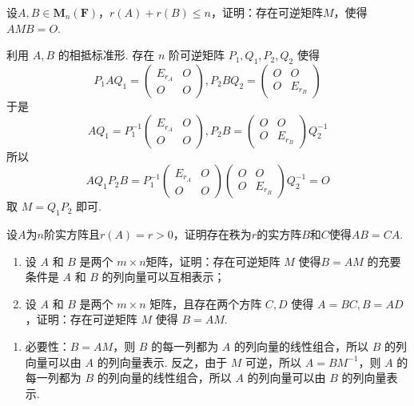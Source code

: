 \begin{exercise}
\begin{exgroup}
        \item 设$A,B \in \mathbf{M}_n(\mathbf{F})$，$r(A)+r(B) \leqslant n$，证明：存在可逆矩阵$M$，使得$AMB=O$.
        \begin{answer}
            利用 $A,B$ 的相抵标准形. 存在 $n$ 阶可逆矩阵 $P_1,Q_1,P_2,Q_2$ 使得
          \[P_1AQ_1=\begin{pmatrix}E_{r_A} & O \\ O & O\end{pmatrix},P_2BQ_2=\begin{pmatrix}O & O \\ O & E_{r_B}\end{pmatrix}\]
          于是 \[AQ_1=P_1^{-1}\begin{pmatrix}E_{r_A} & O \\ O & O\end{pmatrix},P_2B=\begin{pmatrix}O & O \\ O & E_{r_B}\end{pmatrix}Q_2^{-1}\]
          所以 \[AQ_1P_2B=P_1^{-1}\begin{pmatrix}E_{r_A} & O \\ O & O\end{pmatrix}\begin{pmatrix}O & O \\ O & E_{r_B}\end{pmatrix}Q_2^{-1}=O\]
          取 $M=Q_1P_2$ 即可.
        \end{answer}

        \item 设$A$为$n$阶实方阵且$r(A)=r>0$，证明存在秩为$r$的实方阵$B$和$C$使得$AB=CA$.
        \begin{answer}

        \end{answer}

        \item \begin{enumerate}
            \item 设 $A$ 和 $B$ 是两个 $m \times n$矩阵，证明：存在可逆矩阵 $M$ 使得$B = AM$ 的充要条件是 $A$ 和 $B$ 的列向量可以互相表示；
            \item 设 $A$ 和 $B$ 是两个 $m \times n$ 矩阵，且存在两个方阵 $C, D$ 使得 $A = BC, B = AD$，证明：存在可逆矩阵 $M$ 使得 $B = AM$.
        \end{enumerate}
        \begin{answer}
            \begin{enumerate}
                \item 必要性：$B = AM$，则 $B$ 的每一列都为 $A$ 的列向量的线性组合，所以 $B$ 的列向量可以由 $A$ 的列向量表示. 反之，由于 $M$ 可逆，所以 $A = BM^{-1}$，则 $A$ 的每一列都为 $B$ 的列向量的线性组合，所以 $A$ 的列向量可以由 $B$ 的列向量表示.


\end{enumerate}
\end{answer}
\end{exgroup}
\end{exercise}
